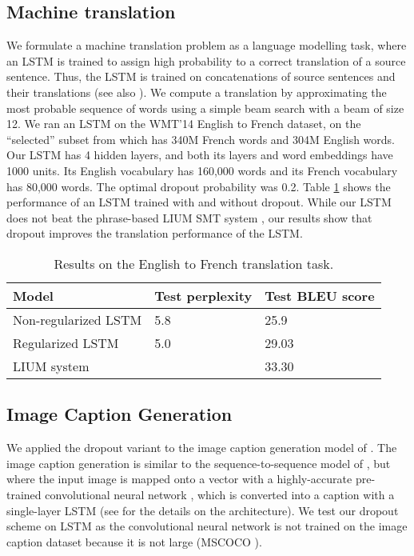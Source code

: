 \documentclass{article} %
\begin{document}
\subsection{Machine translation}
\label{sec:trans}

We formulate a machine translation problem as a language modelling task, where
an LSTM is trained to assign high probability to a correct
translation of a source sentence.  Thus, the LSTM is trained on
concatenations of source sentences and their translations 
\cite{sutskever2014sequence} (see also \cite{cho2014learning}). We compute a translation by 
approximating the most probable sequence of words
using a simple beam search with a beam of size 12.  We ran an
LSTM on the WMT'14 English to French dataset, on the
``selected'' subset from \citet{wmt_joint} which has 340M French words
and 304M English words.  Our LSTM has 4 hidden layers, and both its
layers and word embeddings have 1000 units.  Its 
English vocabulary has 160,000 words and its French vocabulary has
80,000 words.  The optimal dropout probability was 0.2.
Table \ref{tab:mt} shows the performance of an LSTM trained with and without dropout.
While our LSTM does not beat the phrase-based LIUM SMT system
\cite{lium}, our results show that dropout improves the
translation performance of the LSTM.

\begin{table}[t]
  \small
  \centering
  \renewcommand{\arraystretch}{1.15}
  \begin{tabular}{lll}
    \hline
     Model & Test perplexity & Test BLEU score \\
    \hline
    Non-regularized LSTM & 5.8 & 25.9 \\
    Regularized LSTM & 5.0 &  29.03 \\
    \hline
    LIUM system  &  &  33.30 \\
    \hline
  \end{tabular}
  \caption{Results on the English to French translation task. }
  \label{tab:mt}
\end{table}

\subsection{Image Caption Generation}
\label{sec:caption}

We applied the dropout variant 
to the image caption generation model of \cite{vinyals2014show}.  The 
image caption generation is similar to the sequence-to-sequence model
of \cite{sutskever2014sequence}, but where the input image is mapped
onto a vector with a highly-accurate pre-trained convolutional
neural network \citep{szegedy2014going}, which is converted
into a caption with a single-layer LSTM (see \citet{vinyals2014show}
for the details on the architecture).  We test our dropout scheme on  
LSTM as the convolutional neural network is not trained on the image caption
dataset because it is not large (MSCOCO \citep{lin2014microsoft}). 
\end{document}
